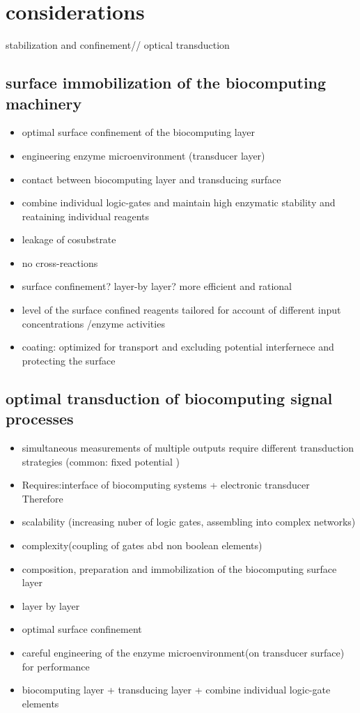 \documentclass[runningheads]{llncs}
\begin{document}
\section{considerations}
stabilization and confinement//
optical transduction 
\subsection{surface immobilization of the biocomputing machinery}
	
	
	
	\begin{itemize}
		\item optimal surface confinement of the biocomputing layer
		\item engineering enzyme microenvironment (transducer layer)
		\item contact between biocomputing layer and transducing surface
		\item combine individual logic-gates and maintain high enzymatic stability and reataining individual reagents
		\item leakage of cosubstrate 
		\item no cross-reactions
		\item surface confinement? layer-by layer? more efficient and rational 
		\item level of the surface confined reagents tailored for account of different input concentrations /enzyme activities 
		\item coating: optimized for transport and excluding potential interfernece and protecting the surface
	\end{itemize}

\subsection{optimal transduction of biocomputing signal processes}
	\begin{itemize}
		\item simultaneous measurements of multiple outputs require different transduction strategies (common: fixed potential )
	\end{itemize}
	\begin{itemize}
		\item Requires:interface of biocomputing systems + electronic transducer\\
		Therefore
		\item scalability (increasing nuber of logic gates, assembling into complex networks)
		\item complexity(coupling of gates abd non boolean elements)
		\item composition, preparation and immobilization of the biocomputing surface layer
		\item layer by layer
		\item optimal surface confinement 
		\item careful engineering of the enzyme microenvironment(on transducer surface) for performance
		\item biocomputing layer + transducing layer + combine individual logic-gate elements	
	\end{itemize}
\end{document}
